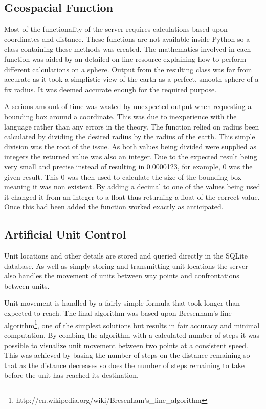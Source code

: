 \subsection{Geospacial Function}
Most of the functionality of the server requires calculations based upon coordinates and distance. These functions are not available inside Python so a class containing these methods was created. The mathematics involved in each function was aided by an detailed on-line resource\cite{geo} explaining how to perform different calculations on a sphere. Output from the resulting class was far from accurate as it took a simplistic view of the earth as a perfect, smooth sphere of a fix radius. It was deemed accurate enough for the required purpose.

A serious amount of time was wasted by unexpected output when requesting a bounding box around a coordinate. This was due to inexperience with the language rather than any errors in the theory. The function relied on radius been calculated by dividing the desired radius by the radius of the earth. This simple division was the root of the issue. As both values being divided were supplied as integers the returned value was also an integer. Due to the expected result being very small and precise instead of resulting in 0.0000123, for example, 0 was the given result. This 0 was then used to calculate the size of the bounding box meaning it was non existent. By adding a decimal to one of the values being used it changed it from an integer to a float thus returning a float of the correct value. Once this had been added the function worked exactly as anticipated.


\subsection{Artificial Unit Control}
Unit locations and other details are stored and queried directly in the SQLite database. As well as simply storing and transmitting unit locations the server also handles the movement of units between way points and confrontations between units.

Unit movement is handled by a fairly simple formula that took longer than expected to reach. The final algorithm was based upon Bresenham's line algorithm\footnote{http://en.wikipedia.org/wiki/Bresenham's\_line\_algorithm}, one of the simplest solutions but results in fair accuracy and minimal computation. By combing the algorithm with a calculated number of steps it was possible to visualize unit movement between two points at a consistent speed. This was achieved by basing the number of steps on the distance remaining so that as the distance decreases so does the number of steps remaining to take before the unit has reached its destination.

